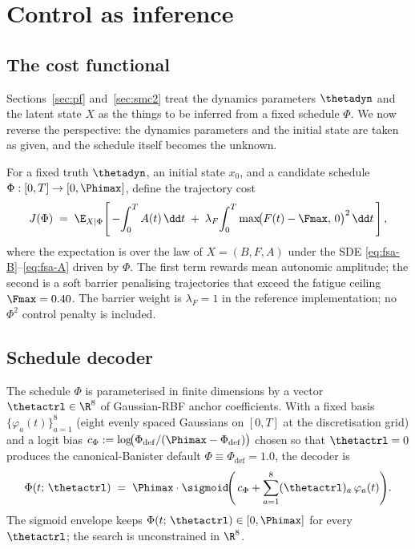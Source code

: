 \section{Control as inference}\label{sec:control}

\subsection{The cost functional}

Sections~\ref{sec:pf} and~\ref{sec:smc2} treat the dynamics parameters
$\thetadyn$ and the latent state $X$ as the things to be inferred from a
fixed schedule $\Phi$. We now reverse the perspective: the dynamics
parameters and the initial state are taken as given, and the schedule
itself becomes the unknown.

For a fixed truth $\thetadyn$, an initial state $x_0$, and a candidate
schedule $\Phi:[0,T]\to[0,\Phimax]$, define the trajectory cost
\begin{equation}
  J(\Phi) \;=\; \E_{X\mid \Phi}\!\left[\,
       -\!\int_0^T A(t)\,\dd t
       \;+\; \lambda_F\!\int_0^T \max\!\bigl(F(t)-\Fmax,\,0\bigr)^2\,\dd t
       \,\right],
  \label{eq:cost}
\end{equation}
where the expectation is over the law of $X = (B,F,A)$ under the SDE
\eqref{eq:fsa-B}--\eqref{eq:fsa-A} driven by $\Phi$. The first term
rewards mean autonomic amplitude; the second is a soft barrier
penalising trajectories that exceed the fatigue ceiling
$\Fmax = 0.40$. The barrier weight is $\lambda_F = 1$ in the reference
implementation; no $\Phi^2$ control penalty is included.

\subsection{Schedule decoder}

The schedule $\Phi$ is parameterised in finite dimensions by a vector
$\thetactrl \in \R^8$ of Gaussian-RBF anchor coefficients. With a fixed
basis $\{\varphi_a(t)\}_{a=1}^{8}$ (eight evenly spaced Gaussians on
$[0,T]$ at the discretisation grid) and a logit bias
$c_\Phi := \log\!\bigl(\Phi_{\mathrm{def}}/(\Phimax-\Phi_{\mathrm{def}})\bigr)$
chosen so that $\thetactrl=0$ produces the canonical-Banister default
$\Phi \equiv \Phi_{\mathrm{def}} = 1.0$, the decoder is
\begin{equation}
  \Phi(t;\,\thetactrl) \;=\;
    \Phimax \cdot \sigmoid\!\Biggl(\,c_\Phi
       + \sum_{a=1}^{8} (\thetactrl)_a\,\varphi_a(t)\Biggr).
  \label{eq:schedule-decoder}
\end{equation}
The sigmoid envelope keeps $\Phi(t;\,\thetactrl) \in [0,\Phimax]$ for
every $\thetactrl$; the search is unconstrained in $\R^8$.

